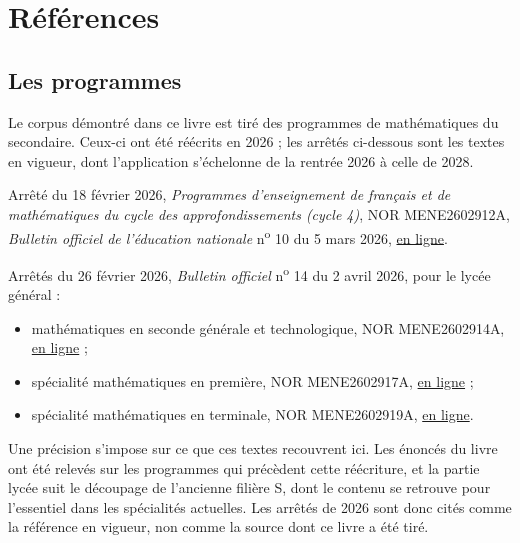%
\chapter*{Références}

\section*{Les programmes}

Le corpus démontré dans ce livre est tiré des programmes de mathématiques du secondaire.
Ceux-ci ont été réécrits en 2026 ; les arrêtés ci-dessous sont les textes en vigueur, dont
l'application s'échelonne de la rentrée 2026 à celle de 2028.

Arrêté du 18 février 2026, \emph{Programmes d'enseignement de français et de mathématiques
du cycle des approfondissements (cycle 4)}, NOR MENE2602912A,
\emph{Bulletin officiel de l'éducation nationale} n\textsuperscript{o} 10 du 5 mars 2026,
\href{https://www.education.gouv.fr/bo/2026/Hebdo10/MENE2602912A}{en ligne}.

\medskip\noindent
Arrêtés du 26 février 2026, \emph{Bulletin officiel} n\textsuperscript{o} 14 du
2 avril 2026, pour le lycée général :

\begin{itemize}
\item mathématiques en seconde générale et technologique, NOR MENE2602914A,
\href{https://www.education.gouv.fr/bo/2026/Hebdo14/MENE2602914A}{en ligne} ;
\item spécialité mathématiques en première, NOR MENE2602917A,
\href{https://www.education.gouv.fr/bo/2026/Hebdo14/MENE2602917A}{en ligne} ;
\item spécialité mathématiques en terminale, NOR MENE2602919A,
\href{https://www.education.gouv.fr/bo/2026/Hebdo14/MENE2602919A}{en ligne}.
\end{itemize}

\noindent
Une précision s'impose sur ce que ces textes recouvrent ici. Les énoncés du livre ont été
relevés sur les programmes qui précèdent cette réécriture, et la partie lycée suit le
découpage de l'ancienne filière S, dont le contenu se retrouve pour l'essentiel dans les
spécialités actuelles. Les arrêtés de 2026 sont donc cités comme la référence en vigueur,
non comme la source dont ce livre a été tiré.

